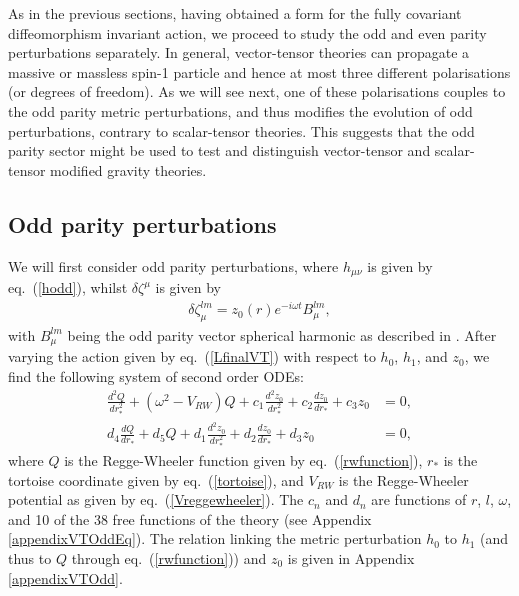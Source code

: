 \documentclass[10pt,twocolumn,preprintnumbers,amsmath,amssymb,nofootinbib
,superscriptaddress]{revtex4-1}
\begin{document}
{As in the previous sections, having obtained a form for the fully covariant diffeomorphism invariant action, we proceed to study the odd and even parity perturbations separately. In general, vector-tensor theories can propagate a massive or massless spin-1 particle and hence at most three different polarisations (or degrees of freedom). As we will see next, one of these polarisations couples to the odd parity metric perturbations, and thus modifies the evolution of odd perturbations, contrary to scalar-tensor theories. This suggests that the odd parity sector might be used to test and distinguish vector-tensor and scalar-tensor modified gravity theories.

\subsection{Odd parity perturbations}\label{VTodd}
We will first consider odd parity perturbations, where $h_{\mu\nu}$ is given by eq.~(\ref{hodd}), whilst $\delta\zeta^\mu$ is given by
\begin{align}
\delta\zeta_\mu^{lm}=z_0(r)e^{-i\omega t}B_\mu^{lm},
\end{align}
with $B_\mu^{lm}$ being the odd parity vector spherical harmonic as described in \cite{Martel:2005ir,Ripley:2017kqg}. After varying the action given by eq.~(\ref{LfinalVT}) with respect to $h_0$, $h_1$, and $z_0$, we find the following system of second order ODEs:
\begin{align}
\frac{d^2 Q}{dr_\ast^2}+\left(\omega^2-V_{RW}\right)Q+c_1\frac{d^2 z_0}{dr_\ast^2}+c_2\frac{d z_0}{dr_\ast}+c_3z_0&=0,\label{VToddeq1}\\
d_4\frac{d Q}{dr_\ast}+d_5Q+d_1\frac{d^2 z_0}{dr_\ast^2}+d_2\frac{d z_0}{dr_\ast}+d_3z_0&=0\label{VToddeq2},
\end{align}
where $Q$ is the Regge-Wheeler function given by eq.~(\ref{rwfunction}), $r_\ast$ is the tortoise coordinate given by eq.~(\ref{tortoise}), and $V_{RW}$ is the Regge-Wheeler potential as given by eq.~(\ref{Vreggewheeler}). The $c_n$ and $d_n$ are functions of $r$, $l$, $\omega$, and 10 of the 38 free functions of the theory (see Appendix \ref{appendixVTOddEq}). The relation linking the metric perturbation $h_0$ to $h_1$ (and thus to $Q$ through eq.~(\ref{rwfunction})) and $z_0$ is given in Appendix \ref{appendixVTOdd}. 

}
\end{document}

